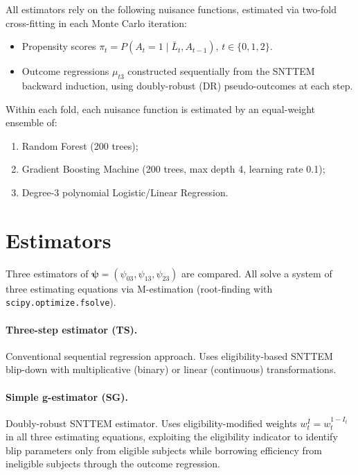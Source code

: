 \documentclass[12pt]{article}
\begin{document}
All estimators rely on the following nuisance functions, estimated
via two-fold cross-fitting in each Monte Carlo iteration:
\begin{itemize}
  \item Propensity scores $\pi_t = P(A_t=1\mid\bar{L}_t,A_{t-1})$,
        $t\in\{0,1,2\}$.
  \item Outcome regressions $\mu_{t3}$ constructed sequentially from the
        SNTTEM backward induction, using doubly-robust (DR) pseudo-outcomes
        at each step.
\end{itemize}
Within each fold, each nuisance function is estimated by an
equal-weight ensemble of:
\begin{enumerate}
  \item Random Forest (200 trees);
  \item Gradient Boosting Machine (200 trees, max depth 4, learning rate 0.1);
  \item Degree-3 polynomial Logistic/Linear Regression.
\end{enumerate}

\section{Estimators}

Three estimators of $\boldsymbol{\psi}=(\psi_{03},\psi_{13},\psi_{23})$
are compared.  All solve a system of three estimating equations via
M-estimation (root-finding with \texttt{scipy.optimize.fsolve}).

\paragraph{Three-step estimator (TS).}
Conventional sequential regression approach.  Uses eligibility-based
SNTTEM blip-down with multiplicative (binary) or linear (continuous)
transformations.

\paragraph{Simple g-estimator (SG).}
Doubly-robust SNTTEM estimator.  Uses eligibility-modified weights
$w_t^I = w_t^{1-I_t}$ in all three estimating equations, exploiting the
eligibility indicator to identify blip parameters only from eligible subjects
while borrowing efficiency from ineligible subjects through the outcome
regression.
\end{document}

